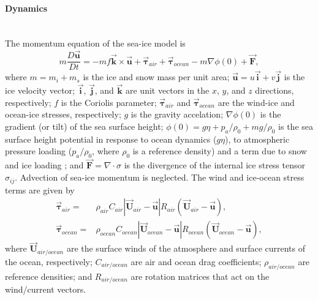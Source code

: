 \paragraph{Dynamics\label{sec:pkg:seaice:dynamics}}~\\
%
\newcommand{\vek}[1]{\ensuremath{\vec{\mathbf{#1}}}}
\newcommand{\vtau}{\vek{\mathbf{\tau}}}
The momentum equation of the sea-ice model is
\begin{equation}
  \label{eq:momseaice}
  m \frac{D\vek{u}}{Dt} = -mf\vek{k}\times\vek{u} + \vtau_{air} +
  \vtau_{ocean} - m \nabla{\phi(0)} + \vek{F},
\end{equation}
where $m=m_{i}+m_{s}$ is the ice and snow mass per unit area;
$\vek{u}=u\vek{i}+v\vek{j}$ is the ice velocity vector;
$\vek{i}$, $\vek{j}$, and $\vek{k}$ are unit vectors in the $x$, $y$, and $z$
directions, respectively;
$f$ is the Coriolis parameter;
$\vtau_{air}$ and $\vtau_{ocean}$ are the wind-ice and ocean-ice stresses,
respectively;
$g$ is the gravity accelation;
$\nabla\phi(0)$ is the gradient (or tilt) of the sea surface height;
$\phi(0) = g\eta + p_{a}/\rho_{0} + mg/\rho_{0}$ is the sea surface
height potential in response to ocean dynamics ($g\eta$), to
atmospheric pressure loading ($p_{a}/\rho_{0}$, where $\rho_{0}$ is a
reference density) and a term due to snow and ice loading \citep{cam08};
and $\vek{F}=\nabla\cdot\sigma$ is the divergence of the internal ice
stress tensor $\sigma_{ij}$. %
Advection of sea-ice momentum is neglected. The wind and ice-ocean stress
terms are given by
\begin{align*}
  \vtau_{air}   = & \rho_{air}  C_{air}   |\vek{U}_{air}  -\vek{u}|
                   R_{air}  (\vek{U}_{air}  -\vek{u}), \\ 
  \vtau_{ocean} = & \rho_{ocean}C_{ocean} |\vek{U}_{ocean}-\vek{u}| 
                   R_{ocean}(\vek{U}_{ocean}-\vek{u}),
\end{align*}
where $\vek{U}_{air/ocean}$ are the surface winds of the atmosphere
and surface currents of the ocean, respectively; $C_{air/ocean}$ are
air and ocean drag coefficients; $\rho_{air/ocean}$ are reference
densities; and $R_{air/ocean}$ are rotation matrices that act on the
wind/current vectors.

